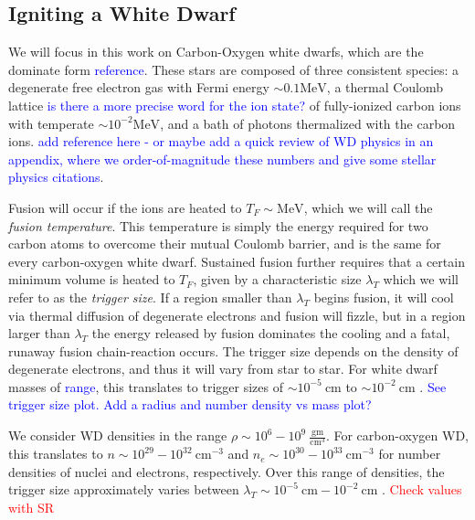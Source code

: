 \documentclass[twocolumn,showpacs,preprintnumbers,amsmath,amssymb,prl]{revtex4}
\newcommand{\MeV}{\text{MeV}}
\begin{document}
\subsection{Igniting a White Dwarf}

We will focus in this work on Carbon-Oxygen white dwarfs, which are the dominate form \textcolor{blue}{reference}.  These stars are composed of three consistent species: a degenerate free electron gas with Fermi energy $\sim 0.1 \MeV$, a thermal Coulomb lattice \textcolor{blue}{is there a more precise word for the ion state?} of fully-ionized carbon ions with temperate $\sim 10^{-2} \MeV$, and a bath of photons thermalized with the carbon ions. \textcolor{blue}{add reference here - or maybe add a quick review of WD physics in an appendix, where we order-of-magnitude these numbers and give some stellar physics citations}.  

Fusion will occur if the ions are heated to $T_F \sim \MeV$, which we will call the \emph{fusion temperature}.  This temperature is simply the energy required for two carbon atoms to overcome their mutual Coulomb barrier, and is the same for every carbon-oxygen white dwarf.  Sustained fusion further requires that a certain minimum volume is heated to $T_F$, given by a characteristic size $\lambda_T$ which we will refer to as the \emph{trigger size}.  If a region smaller than $\lambda_T$ begins fusion, it will cool via thermal diffusion of degenerate electrons and fusion will fizzle, but in a region larger than $\lambda_T$ the energy released by fusion dominates the cooling and a fatal, runaway fusion chain-reaction occurs.  The trigger size depends on the density of degenerate electrons, and thus it will vary from star to star.  For white dwarf masses of \textcolor{blue}{range}, this translates to trigger sizes of $\sim 10^{-5} ~\text{cm}$ to $\sim 10^{-2} ~\text{cm}$ \cite{Graham:2015apa}.  \textcolor{blue}{See trigger size plot. Add a radius and number density vs mass plot?}

We consider WD densities in the range $\rho \sim 10^{6} - 10^{9} ~\frac{\text{gm}}{\text{cm}^3}$. For carbon-oxygen WD, this translates to $n \sim 10^{29} - 10^{32} ~\text{cm}^{-3}$ and $n_e \sim 10^{30} - 10^{33} ~\text{cm}^{-3}$ for number densities of nuclei and electrons, respectively. Over this range of densities, the trigger size approximately varies between $\lambda_T \sim 10^{-5} ~\text{cm} -10^{-2} ~\text{cm}$ \cite{Graham:2015apa}. \textcolor{red}{Check values with SR}
\end{document}
